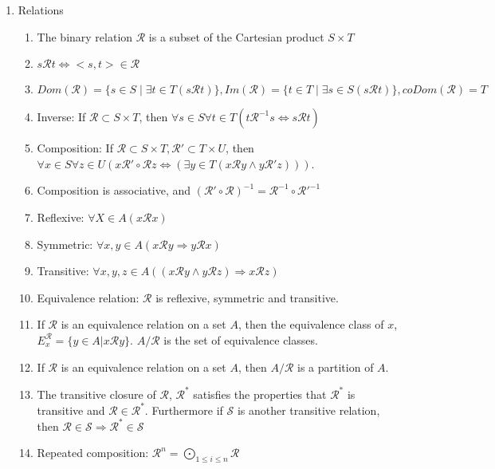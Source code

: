\documentclass[11pt, twocolumn]{article}
\theoremstyle{definition} \newtheorem*{solution}{Solution}
\begin{document}
\begin{enumerate}
\begin{enumerate}
\begin{enumerate}
\end{enumerate}
\end{enumerate}
\item Relations
\begin{enumerate}
\item The binary relation $\mathcal{R}$ is a subset of the Cartesian product $S\times T$
\item $s\mathcal{R}t \Leftrightarrow <s,t>\in \mathcal{R}$
\item $Dom(\mathcal{R}) = \{ s\in S\;|\; \exists t\in T(s\mathcal{R}t)\}, Im(\mathcal{R})=\{ t\in T \;|\; \exists s\in S (s\mathcal{R}t)\}, coDom(\mathcal{R})=T$
\item Inverse: If $\mathcal{R} \subset S\times T$, then $\forall s \in S \forall t \in T (t \mathcal{R}^{-1} s \Leftrightarrow s \mathcal{R} t)$ 
\item Composition: If $\mathcal{R} \subset S\times T, \mathcal{R}' \subset T\times U$, then $\forall x \in S \forall z \in U (x\mathcal{R}' \circ \mathcal{R}z \Leftrightarrow (\exists y \in T (x\mathcal{R}y \wedge y \mathcal{R}'z)))$.
\item Composition is associative, and $(\mathcal{R}'\circ \mathcal{R})^{-1} = \mathcal{R}^{-1} \circ \mathcal{R}'^{-1}$
\item Reflexive: $\forall X \in A (x\mathcal{R}x)$
\item Symmetric: $\forall x, y \in A (x\mathcal{R}y \Rightarrow y\mathcal{R}x)$
\item Transitive: $\forall x, y, z \in A((x\mathcal{R} y \wedge y \mathcal{R}z)\Rightarrow x\mathcal{R}z)$
\item Equivalence relation: $\mathcal{R}$ is reflexive, symmetric and transitive.
\item If $\mathcal{R}$ is an equivalence relation on a set $A$, then the equivalence class of $x$, $E^{\mathcal{R}}_{x} = \{ y\in A | x\mathcal{R} y\}$. $A/\mathcal{R}$ is the set of equivalence classes.
\item If $\mathcal{R}$ is an equivalence relation on a set $A$, then $A/\mathcal{R}$ is a partition of $A$.
\item The transitive closure of $\mathcal{R}$, $\mathcal{R}^*$ satisfies the properties that $\mathcal{R}^*$ is transitive and $\mathcal{R} \in \mathcal{R}^*$. Furthermore if $\mathcal{S}$ is another transitive relation, then $\mathcal{R}\in \mathcal{S} \Rightarrow \mathcal{R}^* \in \mathcal{S}$ 
\item Repeated composition: $\mathcal{R}^n = \bigodot_{1\le i \le n} \mathcal{R}$

\end{enumerate}
\end{enumerate}
\end{document}
